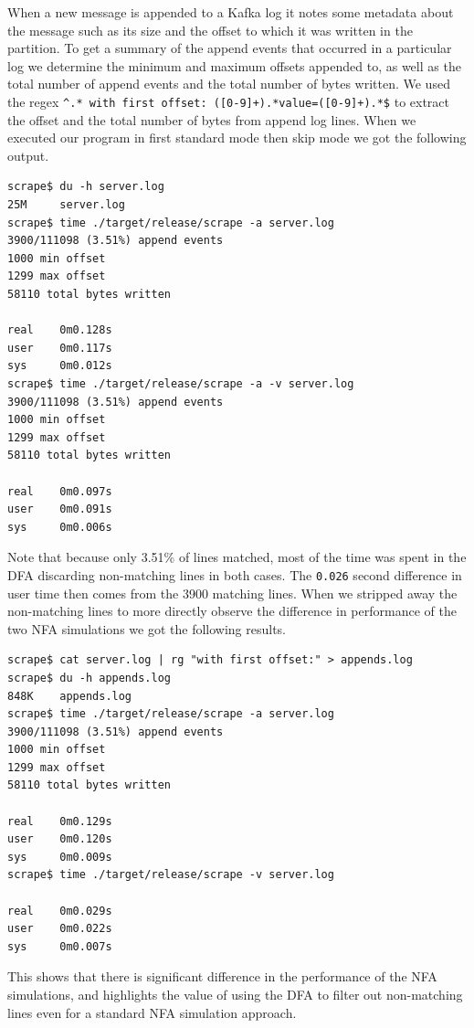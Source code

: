 When a new message is appended to a Kafka log it notes some
metadata about the message such as its size and the offset to
which it was written in the partition. To get a summary of
the append events that occurred in a particular log we 
determine the minimum and maximum offsets appended to,
as well as the total number of append events and the total
number of bytes written. We used the regex
\verb'^.* with first offset: ([0-9]+).*value=([0-9]+).*$'
to extract the offset and the total number of bytes from append
log lines. When we executed our program in first standard mode
then skip mode we got the following output.

\begin{verbatim}
scrape$ du -h server.log
25M     server.log
scrape$ time ./target/release/scrape -a server.log 
3900/111098 (3.51%) append events
1000 min offset
1299 max offset
58110 total bytes written

real    0m0.128s
user    0m0.117s
sys     0m0.012s
scrape$ time ./target/release/scrape -a -v server.log 
3900/111098 (3.51%) append events
1000 min offset
1299 max offset
58110 total bytes written

real    0m0.097s
user    0m0.091s
sys     0m0.006s
\end{verbatim}

Note that because only 3.51\% of lines matched, most of the time
was spent in the DFA discarding non-matching lines in both cases.
The \verb'0.026' second difference in user time then comes from
the 3900 matching lines. When we stripped away the non-matching
lines to more directly observe the difference in performance
of the two NFA simulations we got the following results.

\begin{verbatim}
scrape$ cat server.log | rg "with first offset:" > appends.log 
scrape$ du -h appends.log 
848K    appends.log
scrape$ time ./target/release/scrape -a server.log 
3900/111098 (3.51%) append events
1000 min offset
1299 max offset
58110 total bytes written

real    0m0.129s
user    0m0.120s
sys     0m0.009s
scrape$ time ./target/release/scrape -v server.log 

real    0m0.029s
user    0m0.022s
sys     0m0.007s
\end{verbatim}

This shows that there is significant difference in the performance
of the NFA simulations, and highlights the value of using the DFA
to filter out non-matching lines even for a standard NFA simulation
approach.

